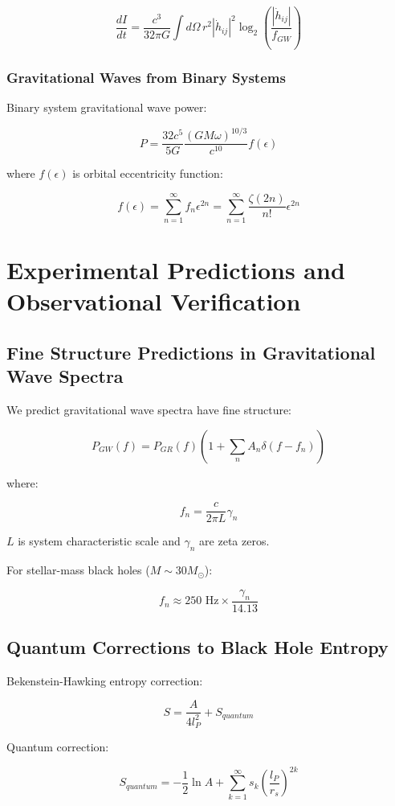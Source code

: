 \documentclass[12pt,a4paper]{article}
\begin{document}
$$\frac{dI}{dt} = \frac{c^3}{32\pi G} \int d\Omega \, r^2 |\dot{h}_{ij}|^2 \log_2\left(\frac{|\dot{h}_{ij}|}{f_{GW}}\right)$$

\subsubsection{Gravitational Waves from Binary Systems}

Binary system gravitational wave power:

$$P = \frac{32c^5}{5G} \frac{(GM\omega)^{10/3}}{c^{10}} f(\epsilon)$$

where $f(\epsilon)$ is orbital eccentricity function:

$$f(\epsilon) = \sum_{n=1}^{\infty} f_n \epsilon^{2n} = \sum_{n=1}^{\infty} \frac{\zeta(2n)}{n!} \epsilon^{2n}$$

\section{Experimental Predictions and Observational Verification}

\subsection{Fine Structure Predictions in Gravitational Wave Spectra}

We predict gravitational wave spectra have fine structure:

$$P_{GW}(f) = P_{GR}(f) \left(1 + \sum_{n} A_n \delta(f - f_n)\right)$$

where:

$$f_n = \frac{c}{2\pi L} \gamma_n$$

$L$ is system characteristic scale and $\gamma_n$ are zeta zeros.

For stellar-mass black holes ($M \sim 30 M_\odot$):

$$f_n \approx 250 \text{ Hz} \times \frac{\gamma_n}{14.13}$$

\subsection{Quantum Corrections to Black Hole Entropy}

Bekenstein-Hawking entropy correction:

$$S = \frac{A}{4l_P^2} + S_{quantum}$$

Quantum correction:

$$S_{quantum} = -\frac{1}{2} \ln A + \sum_{k=1}^{\infty} s_k \left(\frac{l_P}{r_s}\right)^{2k}$$
\end{document}
